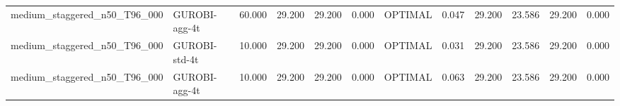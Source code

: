 \begin{table}[htbp]
\begin{tabular}{llrrrrlrrrrr}
medium\_staggered\_n50\_T96\_000 & GUROBI-agg-4t & 60.000 & 29.200 & 29.200 & 0.000 & OPTIMAL & 0.047 & 29.200 & 23.586 & 29.200 & 0.000 \\
medium\_staggered\_n50\_T96\_000 & GUROBI-std-4t & 10.000 & 29.200 & 29.200 & 0.000 & OPTIMAL & 0.031 & 29.200 & 23.586 & 29.200 & 0.000 \\
medium\_staggered\_n50\_T96\_000 & GUROBI-agg-4t & 10.000 & 29.200 & 29.200 & 0.000 & OPTIMAL & 0.063 & 29.200 & 23.586 & 29.200 & 0.000 \\
\bottomrule
\end{tabular}
\end{table}
